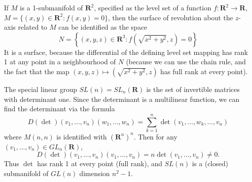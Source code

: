 \begin{example}
    If $M$ is a 1-submanifold of $\mathbf{R}^2$, specified as the level set of a function $f: \mathbf{R}^2 \to \mathbf{R}$, $M = \{ (x,y) \in \mathbf{R}^2: f(x,y) = 0 \}$, then the surface of revolution about the $z$-axis related to $M$ can be identified as the space
    \[ N = \left\{ (x,y,z) \in \mathbf{R}^3: f \left( \sqrt{x^2 + y^2}, z \right) = 0 \right\} \]
    It is a surface, because the differential of the defining level set mapping has rank 1 at any point in a neighbourhood of $N$ (because we can use the chain rule, and the fact that the map $(x,y,z) \mapsto (\sqrt{x^2 + y^2}, z)$ has full rank at every point).
\end{example}

\begin{example}
    The special linear group $SL(n) = SL_n(\mathbf{R})$ is the set of invertible matrices with determinant one. Since the determinant is a multilinear function, we can find the determinant via the formula
    \[ D(\det)(v_1, \dots, v_n)(w_1, \dots, w_n) = \sum_{k = 1}^n \det(v_1, \dots, w_k, \dots, v_n) \]
    where $M(n,n)$ is identified with $(\mathbf{R}^n)^n$. Then for any $(v_1, \dots, v_n) \in GL_n(\mathbf{R})$,
    \[ D(\det)(v_1, \dots, v_n)(v_1, \dots, v_n) = n \det(v_1, \dots, v_n) \neq 0. \]
    Thus $\det$ has rank 1 at every point (full rank), and $SL(n)$ is a (closed) submanifold of $GL(n)$ dimension $n^2 - 1$.
\end{example}

